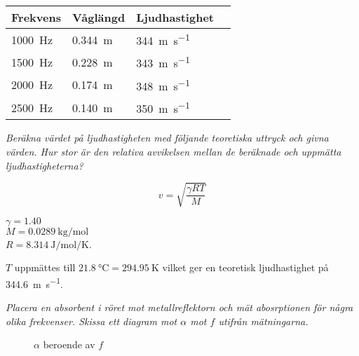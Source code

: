 \documentclass[a4paper,12pt]{article}  %
\begin{document}
\begin{table}[h]
  \begin{tabular}{|l|l|l|l|} \hline
    \bfseries Frekvens & \bfseries Våglängd & \bfseries Ljudhastighet \\\hline
    \SI{1000}{\hertz} & \SI{0.344}{\meter} & \SI{344}{\meter\per\second} \\\hline
    \SI{1500}{\hertz} & \SI{0.228}{\meter} & \SI{343}{\meter\per\second} \\\hline
    \SI{2000}{\hertz} & \SI{0.174}{\meter} & \SI{348}{\meter\per\second} \\\hline
    \SI{2500}{\hertz} & \SI{0.140}{\meter} & \SI{350}{\meter\per\second} \\\hline
  \end{tabular}
\end{table}

\emph{Beräkna värdet på ljudhastigheten med följande teoretiska uttryck och
  givna värden. Hur stor är den relativa avvikelsen mellan de beräknade och
  uppmätta ljudhastigheterna?}

\begin{equation*}
  v = \sqrt{\frac{\gamma R T}{M}}
\end{equation*}

$\gamma = \num{1.40}$ \\ $M = \SI{0.0289}{\kilogram\per\mol}$ \\
$R = \SI{8.314}{\joule\per\mol\per\kelvin}$.

$T$ uppmättes till
$\SI[scientific-notation=false]{21.8}{\celsius} = \SI[scientific-notation=false]{294.95}{\kelvin}$
vilket ger en teoretisk ljudhastighet på
\SI[scientific-notation=false]{344.6}{\meter\per\second}. %

\emph{Placera en absorbent i röret mot metallreflektorn och mät abosrptionen för
några olika frekvenser. Skissa ett diagram mot $\alpha$ mot $f$ utifrån
mätningarna.}

\begin{figure}[h]
  \centering
  \caption{$\alpha$ beroende av $f$}%
  \label{fig:f_alpha}
\end{figure}
\end{document}
